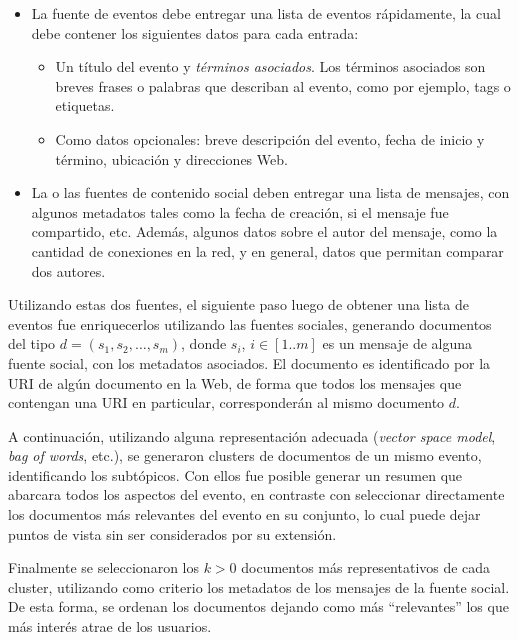 \begin{itemize}
\item La fuente de eventos debe entregar una lista de eventos
     rápidamente, la cual debe contener los siguientes datos para
     cada entrada:

\begin{itemize}
\item Un título del evento y \emph{términos asociados}. Los términos
       asociados son breves frases o palabras que describan al
       evento, como por ejemplo, tags o etiquetas.
\item Como datos opcionales: breve descripción del evento, fecha de
       inicio y término, ubicación y direcciones Web.
\end{itemize}

\item La o las fuentes de contenido social deben entregar una lista de
     mensajes, con algunos metadatos tales como la fecha de creación,
     si el mensaje fue compartido, etc. Además, algunos datos sobre el
     autor del mensaje, como la cantidad de conexiones en la red, y
     en general, datos que permitan comparar dos autores.
\end{itemize}
   Utilizando estas dos fuentes, el siguiente paso luego de obtener
   una lista de eventos fue enriquecerlos utilizando las fuentes
   sociales, generando documentos del tipo
   $d = (s_1, s_2, \ldots, s_m)$, donde  $s_i$, $i \in [1..m]$
   es un mensaje de alguna fuente social, con los
   metadatos asociados. El documento es identificado por la URI de
   algún documento en la Web, de forma que todos los mensajes que
   contengan una URI en particular, corresponderán al mismo documento
   $d$.

   A continuación, utilizando alguna representación adecuada
   (\emph{vector space model}, \emph{bag of words}, etc.), se generaron clusters
   de documentos de un mismo evento, identificando los subtópicos. Con
   ellos fue posible generar un resumen que abarcara todos los
   aspectos del evento, en contraste con seleccionar directamente los
   documentos más relevantes del evento en su conjunto, lo cual puede
   dejar puntos de vista sin ser considerados por su extensión.

   Finalmente se seleccionaron los $k>0$ documentos más representativos de
   cada cluster, utilizando como criterio los metadatos de los
   mensajes de la fuente social. De esta forma, se ordenan los
   documentos dejando como más ``relevantes'' los que más interés atrae
   de los usuarios.

